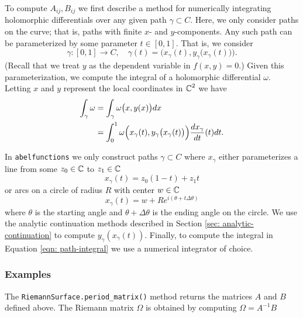 To compute $A_{ij}, B_{ij}$ we first describe a method for numerically
integrating holomorphic differentials over any given path $\gamma
\subset C$. Here, we only consider paths on the curve; that is, paths
with finite $x$- and $y$-components. Any such path can be parameterized
by some parameter $t \in [0,1]$. That is, we consider
\[
    \gamma : [0,1] \to C, \quad \gamma(t) = \Big( x_\gamma(t),
    y_\gamma\big(x_\gamma(t)\big) \Big).
\]
(Recall that we treat $y$ as the dependent variable in $f(x,y)=0$.)
Given this parameterization, we compute the integral of a holomorphic
differential $\omega$. Letting $x$ and $y$ represent the local
coordinates in $\operatorname{\mathbb{C}}^2$ we have
\begin{align*}
    \int_\gamma \omega
    &=
    \int_\gamma \omega\big(x,y(x)\big)dx \notag \\
    &=
    \int_0^1 \omega \Big(
    x_\gamma(t), y_\gamma\big(x_\gamma(t)\big) \Big)
    \frac{dx_\gamma}{dt}(t) dt. \label{eqn: path-integral}
\end{align*}

In {\tt abelfunctions} we only construct paths $\gamma \subset C$ where
$x_\gamma$ either parameterizes a line from some $z_0\in\operatorname{\mathbb{C}}$ to
$z_1\in\operatorname{\mathbb{C}}$
\[
    x_\gamma(t) = z_0(1-t) + z_1t
\]
or arcs on a circle of radius $R$ with center $w\in\operatorname{\mathbb{C}}$
\[
    x_\gamma(t) = w + Re^{i(\theta + t \Delta \theta)}
\]
where $\theta$ is the starting angle and $\theta + \Delta \theta$ is the
ending angle on the circle. We use the analytic continuation methods
described in Section \ref{sec: analytic-continuation} to compute
$y_\gamma(x_\gamma(t))$. Finally, to compute the integral in Equation
\eqref{eqn: path-integral} we use a numerical integrator of choice.

%
\subsubsection*{Examples}
%

The \verb=RiemannSurface.period_matrix()= method returns the matrices
$A$ and $B$ defined above. The Riemann matrix $\Omega$ is obtained by
computing $\Omega = A^{-1}B$

